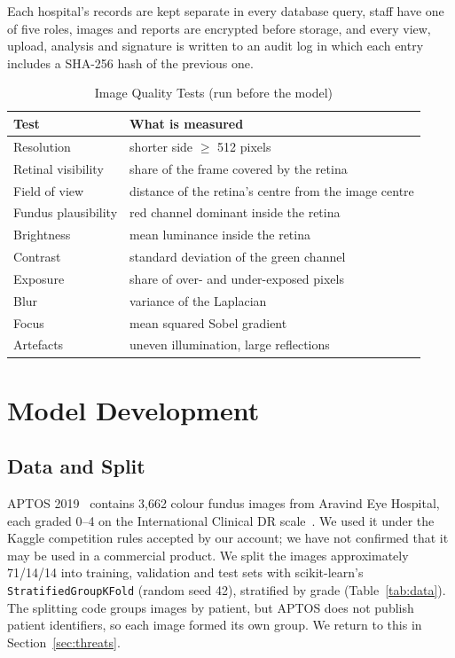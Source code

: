 \documentclass[conference]{IEEEtran}
\begin{document}
Each hospital's records are kept separate in every database query, staff have one of five roles, images and reports
are encrypted before storage, and every view, upload, analysis and signature is written to an audit log in which each
entry includes a SHA-256 hash of the previous one.

\begin{table}[t]
\caption{Image Quality Tests (run before the model)}
\label{tab:iqa}
\centering\scriptsize
\begin{tabular}{@{}ll@{}}
\toprule
Test & What is measured \\
\midrule
Resolution & shorter side $\geq$ 512 pixels \\
Retinal visibility & share of the frame covered by the retina \\
Field of view & distance of the retina's centre from the image centre \\
Fundus plausibility & red channel dominant inside the retina \\
Brightness & mean luminance inside the retina \\
Contrast & standard deviation of the green channel \\
Exposure & share of over- and under-exposed pixels \\
Blur & variance of the Laplacian \\
Focus & mean squared Sobel gradient \\
Artefacts & uneven illumination, large reflections \\
\bottomrule
\end{tabular}
\end{table}

\section{Model Development}
\subsection{Data and Split}
APTOS 2019~\cite{aptos2019} contains 3,662 colour fundus images from Aravind Eye Hospital, each graded 0--4 on the
International Clinical DR scale~\cite{wilkinson2003}. We used it under the Kaggle competition rules accepted by our
account; we have not confirmed that it may be used in a commercial product. We split the images approximately 71/14/14 into training,
validation and test sets with scikit-learn's \texttt{StratifiedGroupKFold} (random seed 42), stratified by grade
(Table~\ref{tab:data}). The splitting code groups images by patient, but APTOS does not publish patient identifiers, so
each image formed its own group. We return to this in Section~\ref{sec:threats}.
\end{document}
